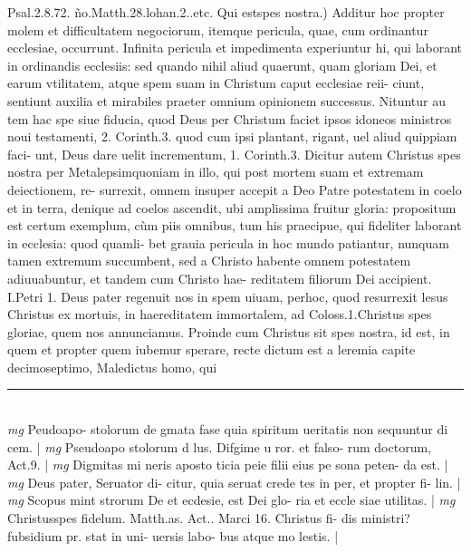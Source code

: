 \documentclass{article}
\begin{document}
\begin{pages}
Psal.2.8.72. ño.Matth.28.lohan.2..etc.  \pend\pstart Qui estspes nostra.) Additur hoc propter molem et difficultatem negociorum, itemque  pericula, quae, cum ordinantur ecclesiae, occurrunt. Infinita pericula et impedimenta experiuntur hi, qui laborant in ordinandis ecclesiis: sed quando nihil aliud quaerunt, quam gloriam Dei, et earum vtilitatem, atque  spem suam in Christum caput ecclesiae reii- ciunt, sentiunt auxilia et mirabiles praeter omnium opinionem successus. Nituntur au tem hac spe siue fiducia, quod Deus per Christum faciet ipsos idoneos ministros noui testamenti, 2. Corinth.3. quod cum ipsi plantant, rigant, uel aliud quippiam faci- unt, Deus dare uelit incrementum, 1. Corinth.3. Dicitur autem Christus spes nostra per Metalepsimquoniam in illo, qui post mortem suam et extremam deiectionem, re- surrexit, omnem insuper accepit a Deo Patre potestatem in coelo et in terra, denique  ad coelos ascendit, ubi amplissima fruitur gloria: propositum est certum exemplum, cùm piis omnibus, tum his praecipue, qui fideliter laborant in ecclesia: quod quamli- bet grauia pericula in hoc mundo patiantur, nunquam tamen extremum succumbent, sed a Christo habente omnem potestatem adiuuabuntur, et tandem cum Christo hae- reditatem filiorum Dei accipient. I.Petri 1. Deus pater regenuit nos in spem uiuam, perhoc, quod resurrexit lesus Christus ex mortuis, in haereditatem immortalem, ad Coloss.1.Christus spes gloriae, quem nos annunciamus.  \pend\pstart Proinde cum Christus sit spes nostra, id est, in quem et propter quem iubemur sperare, recte dictum est a leremia capite decimoseptimo, Maledictus homo, qui  \pend
\vspace{0.5cm}\noindent
\vspace{0.2cm}\rule{1cm}{0.2pt}\\ 
\hspace{0.2cm}\textit{mg}
\footnotesize Peudoapo- stolorum de gmata fase quia spiritum ueritatis non sequuntur di cem. 
\normalsize| 
\hspace{0.2cm}\textit{mg}
\footnotesize Pseudoapo stolorum d lus. Difgime u ror. et falso- rum doctorum, Act.9. 
\normalsize| 
\hspace{0.2cm}\textit{mg}
\footnotesize Digmitas mi neris aposto ticia peie filii eius pe sona peten- da est. 
\normalsize| 
\hspace{0.2cm}\textit{mg}
\footnotesize Deus pater, Seruator di- citur, quia seruat crede tes in per, et propter fi- lin. 
\normalsize| 
\hspace{0.2cm}\textit{mg}
\footnotesize Scopus mint strorum De et ecdesie, est Dei glo- ria et eccle siae utilitas. 
\normalsize| 
\hspace{0.2cm}\textit{mg}
\footnotesize Christusspes fidelum. Matth.as. Act.. Marci 16. Christus fi- dis ministri? fubsidium pr. stat in uni- uersis labo- bus atque  mo lestis. 
\normalsize| 

\end{pages}
\end{document}
